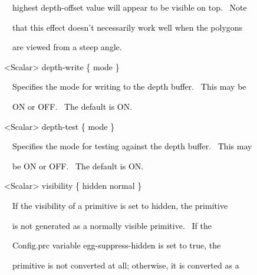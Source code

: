\documentclass[a4paper]{article}
\newcommand\textstyleOOoComputerKeyWord[1]{\textrm{\textcolor[rgb]{0.0,0.0,0.5019608}{#1}}}
\begin{document}
{\color{black}
\textstyleOOoComputerKeyWord{\textcolor{black}{\ \ \ \ highest depth-offset value will appear to be visible on top.
\ Note}}}

{\color{black}
\textstyleOOoComputerKeyWord{\textcolor{black}{\ \ \ \ that this effect doesn't necessarily work well when the
polygons}}}

{\color{black}
\textstyleOOoComputerKeyWord{\textcolor{black}{\ \ \ \ are viewed from a steep angle.}}}


\bigskip

{\color{black}
\textstyleOOoComputerKeyWord{\textcolor{black}{\ \ {\textless}Scalar{\textgreater} depth-write \{ mode \}}}}

\clearpage
\bigskip


\bigskip

{\color{black}
\textstyleOOoComputerKeyWord{\textcolor{black}{\ \ \ \ Specifies the mode for writing to the depth buffer. \ This may
be}}}

{\color{black}
\textstyleOOoComputerKeyWord{\textcolor{black}{\ \ \ \ ON or OFF. \ The default is ON.}}}


\bigskip

{\color{black}
\textstyleOOoComputerKeyWord{\textcolor{black}{\ \ {\textless}Scalar{\textgreater} depth-test \{ mode \}}}}


\bigskip

{\color{black}
\textstyleOOoComputerKeyWord{\textcolor{black}{\ \ \ \ Specifies the mode for testing against the depth buffer. \ This
may}}}

{\color{black}
\textstyleOOoComputerKeyWord{\textcolor{black}{\ \ \ \ be ON or OFF. \ The default is ON.}}}


\bigskip

{\color{black}
\textstyleOOoComputerKeyWord{\textcolor{black}{\ \ {\textless}Scalar{\textgreater} visibility \{ hidden {\textbar}
normal \}}}}


\bigskip

{\color{black}
\textstyleOOoComputerKeyWord{\textcolor{black}{\ \ \ \ If the visibility of a primitive is set to
{\textquotedbl}hidden{\textquotedbl}, the primitive}}}

{\color{black}
\textstyleOOoComputerKeyWord{\textcolor{black}{\ \ \ \ is not generated as a normally visible primitive. \ If the}}}

{\color{black}
\textstyleOOoComputerKeyWord{\textcolor{black}{\ \ \ \ Config.prc variable egg-suppress-hidden is set to true, the}}}

{\color{black}
\textstyleOOoComputerKeyWord{\textcolor{black}{\ \ \ \ primitive is not converted at all; otherwise, it is converted as
a}}}
\end{document}
